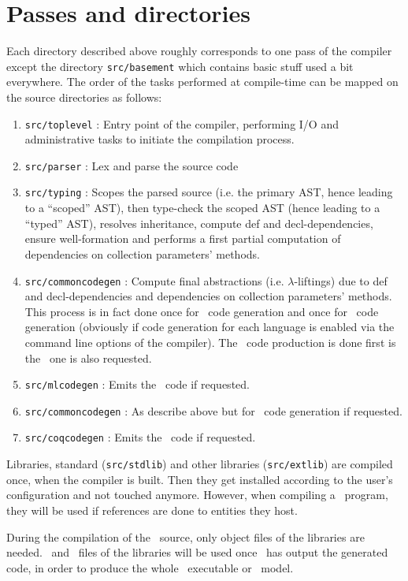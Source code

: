 \section{Passes and directories}
Each directory described above roughly corresponds to one pass of the
compiler except the directory {\tt src/basement} which contains basic
stuff used a bit everywhere. The order of the tasks performed at
compile-time can be mapped on the source directories as follows:
\begin{enumerate}
\item {\tt src/toplevel} : Entry point of the compiler, performing I/O
  and administrative tasks to initiate the compilation process.
\item {\tt src/parser} : Lex and parse the source code
\item {\tt src/typing} : Scopes the parsed source (i.e. the primary
  AST, hence leading to a ``scoped'' AST), then type-check the scoped
  AST (hence leading to a ``typed'' AST), resolves inheritance, compute
  def and decl-dependencies, ensure well-formation and performs a first
  partial computation of dependencies on collection parameters'
  methods.
\item {\tt src/commoncodegen} : Compute final abstractions
  (i.e. $\lambda$-liftings) due to def and decl-dependencies and
  dependencies on collection parameters' methods. This process is in
  fact done once for \ocaml\ code generation and once for \coq\ code
  generation (obviously if code generation for each language is
  enabled via the command line options of the compiler). The \ocaml\
  code production is done first is the \coq\ one is also requested.
\item {\tt src/mlcodegen} : Emits the \ocaml\ code if requested.
\item {\tt src/commoncodegen} : As describe above but for \coq\ code
  generation if requested.
\item {\tt src/coqcodegen} : Emits the \coq\ code if requested.
\end{enumerate}

Libraries, standard ({\tt src/stdlib}) and other libraries
({\tt src/extlib}) are compiled once, when the compiler is built. Then
they get installed according to the user's configuration and not
touched anymore. However, when compiling a \focalize\ program, they
will be used if references are done to entities they host.

During the compilation of the \focalize\ source, only object files of
the libraries are needed. \ocaml\ and \coq\ files of the libraries
will be used once \focalizec\ has output the generated code, in order
to produce the whole \ocaml\ executable or \coq\ model.
